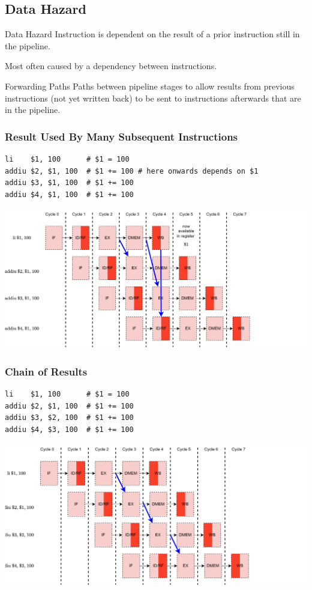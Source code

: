 \subsection{Data Hazard}
\begin{definitionbox}{Data Hazard}
    Instruction is dependent on the result of a prior instruction still in the pipeline.
\end{definitionbox}
Most often caused by a dependency between instructions. 
\begin{definitionbox}{Forwarding Paths}
    Paths between pipeline stages to allow results from previous instructions (not yet written back) to be sent to instructions afterwards that are in the pipeline.
\end{definitionbox}
\subsubsection{Result Used By Many Subsequent Instructions}
\begin{verbatim}
li    $1, 100      # $1 = 100
addiu $2, $1, 100  # $1 += 100 # here onwards depends on $1
addiu $3, $1, 100  # $1 += 100
addiu $4, $1, 100  # $1 += 100
\end{verbatim}
\begin{center}
    \includegraphics[width=.9\textwidth]{pipelining/images/pipeline_operand_forward_1.drawio.png}
\end{center}

\subsubsection{Chain of Results}
\begin{verbatim}
li    $1, 100      # $1 = 100
addiu $2, $1, 100  # $1 += 100
addiu $3, $2, 100  # $1 += 100
addiu $4, $3, 100  # $1 += 100
\end{verbatim}
\begin{center}
    \includegraphics[width=.9\textwidth]{pipelining/images/pipeline_operand_forward_2.drawio.png}
\end{center}
